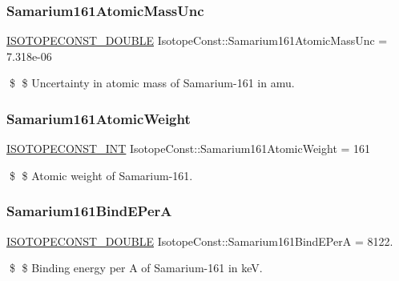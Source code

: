 \subsubsection{\texorpdfstring{Samarium161\+Atomic\+Mass\+Unc}{Samarium161AtomicMassUnc}}
{\footnotesize\ttfamily \mbox{\hyperlink{group___isotope_const-_macros_ga8f45a7272ce02c0b4c65c44636ed719a}{I\+S\+O\+T\+O\+P\+E\+C\+O\+N\+S\+T\+\_\+\+D\+O\+U\+B\+LE}} Isotope\+Const\+::\+Samarium161\+Atomic\+Mass\+Unc = 7.\+318e-\/06}

\$ \$ Uncertainty in atomic mass of Samarium-\/161 in amu. \mbox{\label{group___isotope_const-_samarium-_sm161_gac04359f37823f4c6ca360ee98ddab546}} 
\subsubsection{\texorpdfstring{Samarium161\+Atomic\+Weight}{Samarium161AtomicWeight}}
{\footnotesize\ttfamily \mbox{\hyperlink{group___isotope_const-_macros_ga5f18360b3e99483a35c32d789e62621c}{I\+S\+O\+T\+O\+P\+E\+C\+O\+N\+S\+T\+\_\+\+I\+NT}} Isotope\+Const\+::\+Samarium161\+Atomic\+Weight = 161}

\$ \$ Atomic weight of Samarium-\/161. \mbox{\label{group___isotope_const-_samarium-_sm161_gaea85b34e8053536042b2a9f784a91422}} 
\subsubsection{\texorpdfstring{Samarium161\+Bind\+E\+PerA}{Samarium161BindEPerA}}
{\footnotesize\ttfamily \mbox{\hyperlink{group___isotope_const-_macros_ga8f45a7272ce02c0b4c65c44636ed719a}{I\+S\+O\+T\+O\+P\+E\+C\+O\+N\+S\+T\+\_\+\+D\+O\+U\+B\+LE}} Isotope\+Const\+::\+Samarium161\+Bind\+E\+PerA = 8122.}

\$ \$ Binding energy per A of Samarium-\/161 in keV. \mbox{\label{group___isotope_const-_samarium-_sm161_gabdaadaf551b7c2b8d770944d9c60d25f}} 
